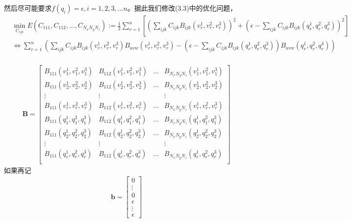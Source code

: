 然后尽可能要求$f(q_i) = \epsilon, i = 1,2,3,...n$。据此我们修改(3.3)中的优化问题，
\begin{equation}
    \begin{split}
        &\min_{C_{ijk}}E(C_{111},C_{112},...,C_{N_xN_yN_z}):= \frac{1}{2}\sum_{r = 1}^{n} [ (\sum_{ijk}C_{ijk}B_{ijk}(v_r^1,v_r^2,v_r^3))^2 + (\epsilon - \sum_{ijk}C_{ijk}B_{ijk}(q_r^1,q_r^2,q_r^3))^2]\\
        &\Leftrightarrow \sum_{r = 1}^n (\sum_{ijk}C_{ijk} B_{ijk}(v_r^1,v_r^2,v_r^3)B_{uvw}(v_r^1,v_r^2,v_r^3) - ( \epsilon - \sum_{ijk} C_{ijk}B_{ijk}(q_r^1,q_r^2,q_r^3) )B_{uvw}(q_r^1,q_r^2,q_r^3))\\
    \end{split}
\end{equation}

\begin{align*}
    \mathbf{B} = \begin{bmatrix}
        B_{111}(v_1^1,v_1^2,v_1^3) & B_{112}(v_1^1,v_1^2,v_1^3) &...& B_{N_xN_yN_z}(v_1^1,v_1^2,v_1^3)\\
        B_{111}(v_2^1,v_2^2,v_2^3) & B_{112}(v_2^1,v_2^2,v_2^3) &...& B_{N_xN_yN_z}(v_2^1,v_2^2,v_2^3)\\
         \vdots & \vdots & & \vdots\\
        B_{111}(v_r^1,v_r^2,v_r^3) & B_{112}(v_r^1,v_r^2,v_r^3) &...& B_{N_xN_yN_z}(v_r^1,v_r^2,v_r^3)\\
        B_{111}(q_1^1,q_1^2,q_1^3) & B_{112}(q_1^1,q_1^2,q_1^3) &...& B_{N_xN_yN_z}(q_1^1,q_1^2,q_1^3)\\
        B_{111}(q_2^1,q_2^2,q_2^3) & B_{112}(q_2^1,q_2^2,q_2^3) &...& B_{N_xN_yN_z}(q_2^1,q_2^2,q_2^3)\\
        \vdots & \vdots & & \vdots\\
        B_{111}(q_r^1,q_r^2,q_r^3) & B_{112}(q_r^1,q_r^2,q_r^3) &...& B_{N_xN_yN_z}(q_r^1,q_r^2,q_r^3)\\
    \end{bmatrix}
\end{align*}
如果再记
\begin{align*}
    \mathbf{b} = \begin{bmatrix}
        0\\
        \vdots\\
        0\\
        \epsilon \\
        \vdots \\
        \epsilon
    \end{bmatrix}
\end{align*}
